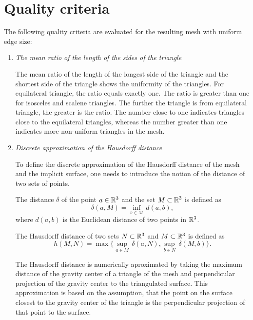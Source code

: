 \section{Quality criteria}
\label{sub4.1}

The following quality criteria \cite{korecova2021triangulation} are evaluated 
for the resulting mesh with uniform edge size:

\begin{enumerate}
    \item \textit{The mean ratio of the length of the sides of the triangle}
    
    The mean ratio of the length of the longest side of the triangle
    and the shortest side of the triangle shows the uniformity of the 
    triangles. 
    For equilateral triangle, the ratio equals exactly one. The ratio is
    greater than one for isosceles and scalene triangles. 
    The further the triangle is from equilateral triangle, the greater is the ratio.
    The number close to one indicates triangles close to the equilateral triangles,
    whereas the number greater than one indicates more non-uniform triangles in the mesh.

    \item \textit{Discrete approximation of the Hausdorff distance}
    
    To define the discrete approximation of the Hausdorff distance of the mesh and
    the implicit surface, one needs to introduce the notion of the distance of two sets
    of points.
\begin{definition} The distance $\delta$ of the point $a\in \mathbb{R}^3$ and the set
    $M \subset \mathbb{R}^3$ is defined as 
    \begin{equation}
        \delta(a, M) = \inf_{b \in M} \, d(a, b),
    \end{equation}
    where $d(a, b)$ is the Euclidean distance of two points in $\mathbb{R}^3$. 
\end{definition}
\begin{definition} The Hausdorff distance of two sets $N \subset \mathbb{R}^3$ and
    $M \subset \mathbb{R}^3$ is defined as
    \begin{equation}
        h(M, N) = \max \big \{\sup_{a \in M} \, \delta(a, N), \sup_{b \in N} \, \delta(M, b) \big \}.
    \end{equation}
\end{definition}
    The Hausdorff distance is numerically aproximated by taking the maximum distance
    of the gravity center of a triangle of the mesh and perpendicular projection of
    the gravity center to the triangulated surface.
    This approximation is based on the assumption, that the point on the surface
    closest to the gravity center of the triangle is the perpendicular projection of
    that point to the surface.


\end{enumerate}
